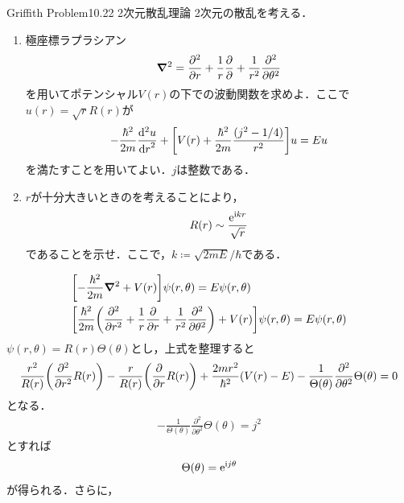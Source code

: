 \documentclass{report}
\begin{document}
  \begin{myexc}{Griffith Problem10.22 2次元散乱理論}{}
    2次元の散乱を考える．
  \begin{enumerate}
    \item 極座標ラプラシアン
    \begin{align}
      \grad^2= \frac{\partial^2}{\partial r} + \frac{1}{r}\frac{\partial}{\partial} + \frac{1}{r^2}\frac{\partial^2}{\partial \theta^2}
    \end{align}
    を用いてポテンシャル$V(r)$の下での波動関数を求めよ．ここで$u(r)=\sqrt{r}R(r)$が
    \begin{align}
      -\frac{\hbar^2}{2m}\frac{\mathrm{d}^2 u}{\dd{r}^2} + \qty[V(r) + \frac{\hbar^2}{2m}\frac{(j^2 - 1/4)}{r^2}]u = Eu \label{eq-for-u}
    \end{align}
    を満たすことを用いてよい．$j$は整数である．
    \item $r$が十分大きいときのを考えることにより，
    \begin{align}
      R(r) \sim \frac{\mathrm{e}^{\mathrm{i} kr}}{\sqrt{r}}
    \end{align}
    であることを示せ．ここで，$k\coloneqq \sqrt{2mE}/\hbar$である．
  \end{enumerate}
    \tcblower
    \begin{align}
      &\qty[-\frac{\hbar^2}{2m}\grad^2 + V(r)]\psi(r,\theta) = E\psi(r,\theta)\\
      &\qty[\frac{\hbar^2}{2m}\qty(\frac{\partial^2}{\partial r^2} + \frac{1}{r}\frac{\partial}{\partial r} + \frac{1}{r^2}\frac{\partial^2}{\partial \theta^2}) + V(r)]\psi(r,\theta) = E\psi(r,\theta)
    \end{align}
    $\psi(r,\theta) = R(r)\Theta(\theta)$とし，上式を整理すると
    \begin{align}
      \frac{r^2}{R(r)}\qty(\frac{\partial^2}{\partial r^2}R(r)) - \frac{r}{R(r)}\qty(\frac{\partial}{\partial r}R(r)) + \frac{2mr^2}{\hbar^2}(V(r) - E) - \frac{1}{\Theta(\theta)} \frac{\partial^2}{\partial \theta^2}\Theta(\theta) = 0
    \end{align}
    となる．
    \begin{align}
      - \frac{1}{\Theta(\theta)} \frac{\partial^2}{\partial \theta^2}\Theta(\theta) = j^2
    \end{align}
    とすれば
    \begin{align}
      \Theta(\theta) = \mathrm{e}^{\mathrm{i} j\theta}
    \end{align}
    が得られる．さらに，
    \begin{align}

\end{align}
\end{myexc}
\end{document}
